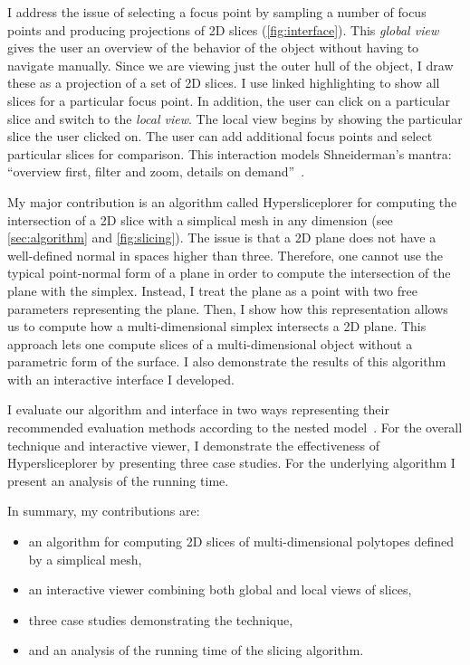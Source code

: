 
I address the issue of selecting a focus point by sampling a number of focus
points and producing projections of 2D slices (\autoref{fig:interface}). This
\emph{global view} gives the user an overview of the behavior of the object
without having to navigate manually. Since we are viewing just
the outer hull of the object, I draw these as a projection of a set of 2D
slices. I use linked highlighting to show all slices for a particular focus
point. In addition, the user can click on a particular slice and switch to the
\emph{local view}. The local view begins by showing the particular slice the
user clicked on. The user can add additional focus points and select particular
slices for comparison. This interaction models Shneiderman's mantra: ``overview
first, filter and zoom, details on demand''~\cite{Shneiderman:1996}.

My major contribution is an algorithm called Hypersliceplorer for computing the
intersection of a 2D slice with a simplical mesh in any dimension (see
\autoref{sec:algorithm} and \autoref{fig:slicing}). The issue is that a 2D
plane does not have a well-defined normal in spaces higher than three.
Therefore, one cannot use the typical point-normal form of a plane in order to
compute the intersection of the plane with the simplex. Instead, I treat the
plane as a point with two free parameters representing the plane. Then, I show
how this representation allows us to compute how a multi-dimensional simplex
intersects a 2D plane. This approach lets one compute slices of a
multi-dimensional object without a parametric form of the surface. I also
demonstrate the results of this algorithm with an interactive interface I
developed.

I evaluate our algorithm and interface in two ways representing their recommended
evaluation methods according to the nested
model~\cite{Munzner:2009}. For the overall technique and
interactive viewer, I demonstrate the effectiveness of Hypersliceplorer by
presenting three case studies. For the underlying algorithm I present an
analysis of the running time. 

In summary, my contributions are:
\begin{itemize}
\item
  an algorithm for computing 2D slices of multi-dimensional polytopes defined by a
  simplical mesh,
\item
  an interactive viewer combining both global and local views of slices,
\item
  three case studies demonstrating the technique,
\item
  and an analysis of the running time of the slicing algorithm.
\end{itemize}

